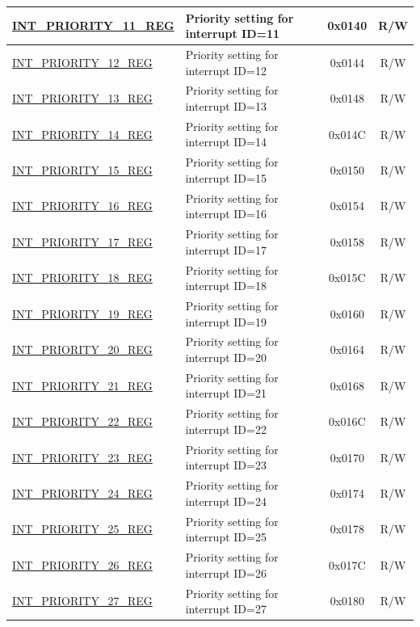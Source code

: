 \begin{longtable}{ | p{4.0cm} | p{8.4cm} | c | c| }
\hyperref[regdesc:INTPRIORITYREG]{INT\_PRIORITY\_11\_REG} & Priority setting for interrupt ID=11 & 0x0140 & R/W \\\hline
\hyperref[regdesc:INTPRIORITYREG]{INT\_PRIORITY\_12\_REG} & Priority setting for interrupt ID=12 & 0x0144 & R/W \\\hline
\hyperref[regdesc:INTPRIORITYREG]{INT\_PRIORITY\_13\_REG} & Priority setting for interrupt ID=13 & 0x0148 & R/W \\\hline
\hyperref[regdesc:INTPRIORITYREG]{INT\_PRIORITY\_14\_REG} & Priority setting for interrupt ID=14 & 0x014C & R/W \\\hline
\hyperref[regdesc:INTPRIORITYREG]{INT\_PRIORITY\_15\_REG} & Priority setting for interrupt ID=15 & 0x0150 & R/W \\\hline
\hyperref[regdesc:INTPRIORITYREG]{INT\_PRIORITY\_16\_REG} & Priority setting for interrupt ID=16 & 0x0154 & R/W \\\hline
\hyperref[regdesc:INTPRIORITYREG]{INT\_PRIORITY\_17\_REG} & Priority setting for interrupt ID=17 & 0x0158 & R/W \\\hline
\hyperref[regdesc:INTPRIORITYREG]{INT\_PRIORITY\_18\_REG} & Priority setting for interrupt ID=18 & 0x015C & R/W \\\hline
\hyperref[regdesc:INTPRIORITYREG]{INT\_PRIORITY\_19\_REG} & Priority setting for interrupt ID=19 & 0x0160 & R/W \\\hline
\hyperref[regdesc:INTPRIORITYREG]{INT\_PRIORITY\_20\_REG} & Priority setting for interrupt ID=20 & 0x0164 & R/W \\\hline
\hyperref[regdesc:INTPRIORITYREG]{INT\_PRIORITY\_21\_REG} & Priority setting for interrupt ID=21 & 0x0168 & R/W \\\hline
\hyperref[regdesc:INTPRIORITYREG]{INT\_PRIORITY\_22\_REG} & Priority setting for interrupt ID=22 & 0x016C & R/W \\\hline
\hyperref[regdesc:INTPRIORITYREG]{INT\_PRIORITY\_23\_REG} & Priority setting for interrupt ID=23 & 0x0170 & R/W \\\hline
\hyperref[regdesc:INTPRIORITYREG]{INT\_PRIORITY\_24\_REG} & Priority setting for interrupt ID=24 & 0x0174 & R/W \\\hline
\hyperref[regdesc:INTPRIORITYREG]{INT\_PRIORITY\_25\_REG} & Priority setting for interrupt ID=25 & 0x0178 & R/W \\\hline
\hyperref[regdesc:INTPRIORITYREG]{INT\_PRIORITY\_26\_REG} & Priority setting for interrupt ID=26 & 0x017C & R/W \\\hline
\hyperref[regdesc:INTPRIORITYREG]{INT\_PRIORITY\_27\_REG} & Priority setting for interrupt ID=27 & 0x0180 & R/W \\\hline

\end{longtable}
